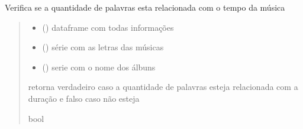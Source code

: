 \documentclass[letterpaper,10pt,english]{sphinxmanual}
\begin{document}
\begin{fulllineitems}
\label{\detokenize{index:functions.palavras_duracao}}
\pysigstartsignatures
{}
\pysigstopsignatures
\sphinxAtStartPar
Verifica se a quantidade de palavras esta relacionada com o tempo da música
\begin{quote}\begin{description}
\begin{itemize}
\item {} 
\sphinxAtStartPar
{} () \textendash{} dataframe com todas informações

\item {} 
\sphinxAtStartPar
{} () \textendash{} série com as letras das músicas

\item {} 
\sphinxAtStartPar
{} () \textendash{} serie com o nome dos álbuns

\end{itemize}

\sphinxAtStartPar
retorna verdadeiro caso a quantidade de palavras esteja relacionada com a duração e falso caso não esteja

\sphinxAtStartPar
bool

\end{description}\end{quote}

\end{fulllineitems}

\end{document}
